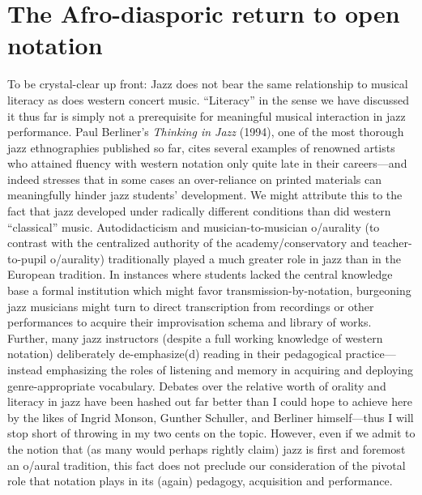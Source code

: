     \section[The Afro-diasporic return to open notation]{The Afro-diasporic return to open notation}

    To be crystal-clear up front: Jazz does not bear the same relationship to musical literacy as does western concert music. ``Literacy'' in the sense we have discussed it thus far is simply not a prerequisite for meaningful musical interaction in jazz performance. Paul Berliner's \textit{Thinking in Jazz} (1994), one of the most thorough jazz ethnographies published so far, cites several examples of renowned artists who attained fluency with western notation only quite late in their careers---and indeed stresses that in some cases an over-reliance on printed materials can meaningfully hinder jazz students' development\autocite[111]{Berliner_1994}. We might attribute this to the fact that jazz developed under radically different conditions than did western ``classical'' music. Autodidacticism and musician-to-musician o/aurality (to contrast with the centralized authority of the academy/conservatory and teacher-to-pupil o/aurality) traditionally played a much greater role in jazz than in the European tradition. In instances where students lacked the central knowledge base a formal institution which might favor transmission-by-notation, burgeoning jazz musicians might turn to direct transcription from recordings or other performances to acquire their improvisation schema and library of works. Further, many jazz instructors (despite a full working knowledge of western notation) deliberately de-emphasize(d) reading in their pedagogical practice---instead emphasizing the roles of listening and memory in acquiring and deploying genre-appropriate vocabulary.\autocite[112--3]{Berliner_1994} Debates over the relative worth of orality and literacy in jazz have been hashed out far better than I could hope to achieve here by the likes of Ingrid Monson, Gunther Schuller, and Berliner himself---thus I will stop short of throwing in my two cents on the topic. However, even if we admit to the notion that (as many would perhaps rightly claim) jazz is first and foremost an o/aural tradition, this fact does not preclude our consideration of the pivotal role that notation plays in its (again) pedagogy, acquisition and performance. 

